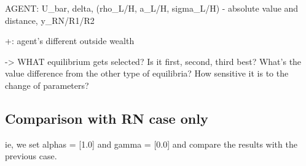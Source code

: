     AGENT: U_bar, delta, (rho_L/H, a_L/H, sigma_L/H) - absolute value and distance, y_RN/R1/R2

    +: agent's different outside wealth

    -> WHAT equilibrium gets selected? Is it first, second, third best? What's the value difference from the other type of equilibria? How sensitive it is to the change of parameters?




\subsection*{Comparison with RN case only}
ie, we set alphas = [1.0] and gamma = [0.0] and compare the results with the previous case.